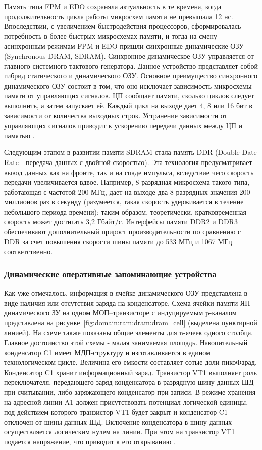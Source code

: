 Память типа FPM и EDO сохраняла актуальность в те времена, когда продолжительность цикла работы микросхем памяти не превышала 12 нс. Впоследствии, с увеличением быстродействия процессоров, сформировалась потребность в более быстрых микросхемах памяти, и тогда на смену асинхронным режимам FPM и EDO пришли синхронные динамические ОЗУ (Synchronous DRAM, SDRAM). Синхронное динамическое ОЗУ управляется от главного системного тактового генератора. Данное устройство представляет собой гибрид статического и динамического ОЗУ. Основное преимущество синхронного динамического ОЗУ состоит в том, что оно исключает зависимость микросхемы памяти от управляющих сигналов. ЦП сообщает памяти, сколько циклов следует выполнить, а затем запускает её. Каждый цикл на выходе дает 4, 8 или 16 бит в зависимости от количества выходных строк. Устранение зависимости от управляющих сигналов приводит к ускорению передачи данных между ЦП и памятью \cite{ibm_dram_article}.

Следующим этапом в развитии памяти SDRAM стала память DDR (Double Date Rate - передача данных с двойной скоростью). Эта технология предусматривает вывод данных как на фронте, так и на спаде импульса, вследствие чего скорость передачи увеличивается вдвое. Например, 8-разрядная микросхема такого типа, работающая с частотой 200 МГц, дает на выходе два 8-разрядных значения 200 миллионов раз в секунду (разумеется, такая скорость удерживается в течение небольшого периода времени); таким образом, теоретически, кратковременная скорость может достигать 3,2 Гбайт/с. Интерфейсы памяти DDR2 и DDR3 обеспечивают дополнительный прирост производительности по сравнению с DDR за счет повышения скорости шины памяти до 533 МГц и 1067 МГц соответственно.

\subsubsection{Динамические оперативные запоминающие устройства}
\label{sub:domain:ram:dram}
Как уже отмечалось, информация в ячейке динамического ОЗУ представлена в виде наличия или отсутствия заряда на конденсаторе. Схема ячейки памяти ЯП динамического ЗУ на одном МОП–транзисторе с индуцируемым p-каналом представлена на рисунке~\ref{fig:domain:ram:dram:dram_cell} (выделена пунктирной линией). На схеме также показаны общие элементы для n-ячеек одного столбца. Главное достоинство этой схемы - малая занимаемая площадь. Накопительный конденсатор C1 имеет МДП-структуру и изготавливается в едином технологическом цикле. Величина его емкости составляет сотые доли пикоФарад. Конденсатор C1 хранит информационный заряд. Транзистор VT1 выполняет роль переключателя, передающего заряд конденсатора в разрядную шину данных ШД при считывании, либо заряжающего конденсатор при записи. В режиме хранения на адресной линии A1 должен присутствовать потенциал логической единицы, под действием которого транзистор VT1 будет закрыт и конденсатор C1 отключен от шины данных ШД. Включение конденсатора в шину данных осуществляется логическим нулем на линии. При этом на транзистор VT1 подается напряжение, что приводит к его открыванию \cite{ibm_dram_article}.

